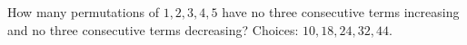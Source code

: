 How many permutations of $1,2,3,4,5$ have no three consecutive terms increasing and no three consecutive terms decreasing? Choices: $10,18,24,32,44$.
